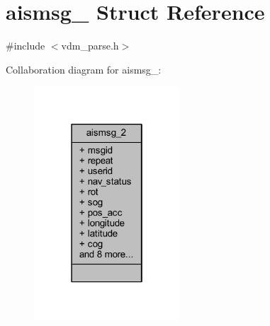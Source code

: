 \hypertarget{structaismsg__2}{}\section{aismsg\+\_ Struct Reference}
\label{structaismsg__2}


{\ttfamily \#include $<$vdm\+\_\+parse.\+h$>$}



Collaboration diagram for aismsg\+\_\+:
\nopagebreak
\begin{figure}[H]
\begin{center}
\leavevmode
\includegraphics[width=154pt]{structaismsg__2__coll__graph}
\end{center}
\end{figure}
